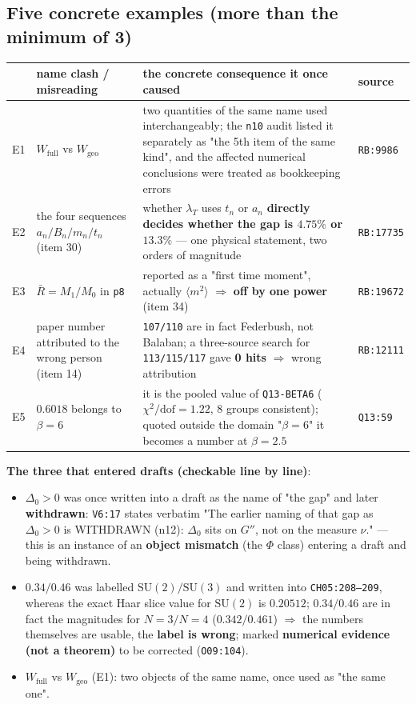 \documentclass[11pt,a4paper]{article}
\newcommand{\lvE}{\textcolor{cE}{\textbf{numerical evidence (not a theorem)}}}
\newcommand{\bet}{\beta}
\newcommand{\Dzero}{\Delta_0}
\newcommand{\Rbar}{\bar{R}}
\newcommand{\Wfull}{W_{\mathrm{full}}}
\newcommand{\Wgeo}{W_{\mathrm{geo}}}
\begin{document}
\subsection{Five concrete examples (more than the minimum of 3)}

\begin{center}
\small
\footnotesize
\begin{tabularx}{\textwidth}{@{}L{0.5cm} L{2.5cm} Y L{2.6cm}@{}}
\toprule
 & \textbf{name clash / misreading} & \textbf{the concrete consequence it once caused} & \textbf{source} \\
\midrule
E1 & $\Wfull$ vs $\Wgeo$ & two quantities of the same name used interchangeably; the \texttt{n10} audit listed it separately as "the 5th item of the same kind", and the affected numerical conclusions were treated as bookkeeping errors & \texttt{RB:9986} \\
E2 & the four sequences $a_n/B_n/m_n/t_n$ (item 30) & whether $\lambda_T$ uses $t_n$ or $a_n$ \textbf{directly decides whether the gap is $4.75\%$ or $13.3\%$} --- one physical statement, two orders of magnitude & \texttt{RB:17735} \\
E3 & $\Rbar=M_1/M_0$ in \texttt{p8} & reported as a "first time moment", actually $\langle m^2\rangle$ $\Rightarrow$ \textbf{off by one power} (item 34) & \texttt{RB:19672} \\
E4 & paper number attributed to the wrong person (item 14) & \texttt{107/110} are in fact Federbush, not Balaban; a three-source search for \texttt{113/115/117} gave \textbf{0 hits} $\Rightarrow$ wrong attribution & \texttt{RB:12111} \\
E5 & $0.6018$ belongs to $\bet=6$ & it is the pooled value of \texttt{Q13-BETA6} ($\chi^2/\mathrm{dof}=1.22$, 8 groups consistent); quoted outside the domain "$\bet=6$" it becomes a number at $\bet=2.5$ & \texttt{Q13:59} \\
\bottomrule
\end{tabularx}
\end{center}

\noindent\textbf{The three that entered drafts (checkable line by line)}:
\begin{itemize}[leftmargin=1.5em,itemsep=2pt,topsep=2pt]
  \item $\Dzero>0$ was once written into a draft as the name of "the gap" and later \textbf{withdrawn}: \texttt{V6:17} states verbatim "The earlier naming of that gap as $\Dzero>0$ is WITHDRAWN (n12): $\Dzero$ sits on $G''$, not on the measure $\nu$." --- this is an instance of an \textbf{object mismatch} (the $\Phi$ class) entering a draft and being withdrawn.
  \item $0.34/0.46$ was labelled $\mathrm{SU}(2)/\mathrm{SU}(3)$ and written into \texttt{CH05:208--209}, whereas the exact Haar slice value for $\mathrm{SU}(2)$ is $0.20512$; $0.34/0.46$ are in fact the magnitudes for $N=3/N=4$ ($0.342/0.461$) $\Rightarrow$ the numbers themselves are usable, the \textbf{label is wrong}; marked \lvE{} to be corrected (\texttt{O09:104}).
  \item $\Wfull$ vs $\Wgeo$ (E1): two objects of the same name, once used as "the same one".
\end{itemize}
\end{document}
